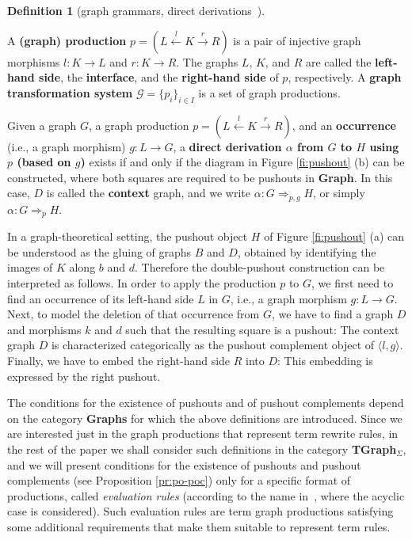 \documentclass{eptcs}
\theoremstyle{plain}
\theoremstyle{definition}
\newtheorem{definition}[theorem]{Definition}
\begin{document}
\begin{definition}
[graph grammars, direct derivations~\cite{Ehr:TIAA}]
\label{de:graph-grammar}

A {\bf (graph) production\/} $p = (L \stackrel{l}{\leftarrow} K
\stackrel{r}{\rightarrow} R)$ is a pair of injective 
graph morphisms $l: K \rightarrow L$ and $r: K \rightarrow R$.  The
graphs $L$, $K$, and $R$ are called the {\bf left-hand side},
the {\bf interface}, and the {\bf right-hand side} of $p$,
respectively. 
A {\bf graph transformation system} $\mathcal{G} = \{p_i\}_{i\in
I}$ is a set of graph productions.


Given a graph $G$, a graph production $p = (L
\stackrel{l}{\leftarrow} K \stackrel{r}{\rightarrow}  R)$, and an 
{\bf occurrence\/} (i.e., a graph morphism) $g: L \rightarrow G$, a
{\bf direct derivation $\alpha$ from $G$ to $H$ using $p$ (based on 
$g$)}
exists if and only if the diagram in Figure \ref{fi:pushout} (b)
can be constructed, where both squares are required to be 
pushouts in
{\bf Graph}. In this case, $D$ is called the {\bf context\/} graph,
and we write $\alpha : G \Rightarrow_{p,g} H$, or simply $\alpha : G 
\Rightarrow_p H$.
\end{definition}


In a graph-theoretical setting, the pushout object $H$ of Figure
\ref{fi:pushout} (a) can be understood as the gluing of graphs $B$ and 
$D$, obtained by identifying the images of $K$ along $b$ and $d$. 
Therefore the double-pushout construction can be interpreted as 
follows. In
order to apply the production $p$ to $G$, we first need to find an
occurrence of its left-hand side $L$ in $G$, i.e., a graph morphism 
$g: L
\rightarrow G$. Next, to model the deletion of that occurrence from
$G$, we have to find a graph $D$ and morphisms $k$ and $d$ such that
the resulting square is a pushout: The context graph $D$ is 
characterized categorically as the pushout
complement object of $\langle l, g \rangle$. Finally, we have to
embed the right-hand side $R$ into $D$: This embedding 
is expressed by the right pushout. 

The conditions for the existence of 
pushouts and of pushout complements depend on the category {\bf 
Graphs} 
for which the above definitions are introduced. Since we are 
interested 
just in the graph productions that represent term rewrite rules, in 
the 
rest of the paper we shall consider such definitions in the category 
{\bf TGraph$_\Sigma$}, and we will present conditions for the 
existence
of pushouts and pushout complements (see Proposition \ref{pr:po-poc}) 
only for a specific format of productions, called 
{\em evaluation rules} (according to the name in~\cite{HP:ITRJ}, where 
the
acyclic case is considered). 
Such evaluation rules are term graph productions satisfying 
some additional requirements that make them suitable to represent term 
rules.
\end{document}
